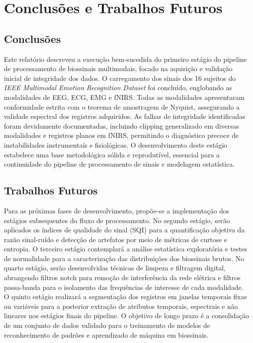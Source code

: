 \chapter{Conclusões e Trabalhos Futuros}
\label{chap:conclusoes-e-trabalhos-futuros}

\section{Conclusões}

Este relatório descreveu a execução bem-sucedida do primeiro estágio do pipeline de processamento de biossinais multimodais, focado na aquisição e validação inicial de integridade dos dados. O carregamento dos sinais dos 16 sujeitos do \textit{IEEE Multimodal Emotion Recognition Dataset} foi concluído, englobando as modalidades de EEG, ECG, EMG e fNIRS. Todas as modalidades apresentaram conformidade estrita com o teorema de amostragem de Nyquist, assegurando a validade espectral dos registros adquiridos. As falhas de integridade identificadas foram devidamente documentadas, incluindo clipping generalizado em diversas modalidades e registros planos em fNIRS, permitindo o diagnóstico precoce de instabilidades instrumentais e fisiológicas. O desenvolvimento deste estágio estabelece uma base metodológica sólida e reprodutível, essencial para a continuidade do pipeline de processamento de sinais e modelagem estatística.

\section{Trabalhos Futuros}

Para as próximas fases de desenvolvimento, propõe-se a implementação dos estágios subsequentes do fluxo de processamento. No segundo estágio, serão aplicados os índices de qualidade do sinal (SQI) para a quantificação objetiva da razão sinal-ruído e detecção de artefatos por meio de métricas de curtose e entropia. O terceiro estágio contemplará a análise estatística exploratória e testes de normalidade para a caracterização das distribuições dos biossinais brutos. No quarto estágio, serão desenvolvidas técnicas de limpeza e filtragem digital, abrangendo filtros notch para remoção de interferência da rede elétrica e filtros passa-banda para o isolamento das frequências de interesse de cada modalidade. O quinto estágio realizará a segmentação dos registros em janelas temporais fixas ou variáveis para a posterior extração de atributos temporais, espectrais e não lineares nos estágios finais do pipeline. O objetivo de longo prazo é a consolidação de um conjunto de dados validado para o treinamento de modelos de reconhecimento de padrões e aprendizado de máquina em biossinais.
